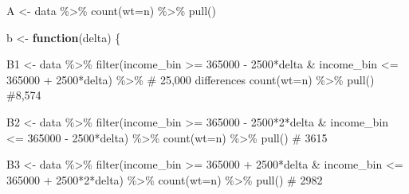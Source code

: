 \documentclass[
  letterpaper,
  DIV=11,
  numbers=noendperiod]{scrartcl}
\newenvironment{Shaded}{\begin{snugshade}}{\end{snugshade}}
\newcommand{\AttributeTok}[1]{\textcolor[rgb]{0.40,0.45,0.13}{#1}}
\newcommand{\CommentTok}[1]{\textcolor[rgb]{0.37,0.37,0.37}{#1}}
\newcommand{\ControlFlowTok}[1]{\textcolor[rgb]{0.00,0.23,0.31}{\textbf{#1}}}
\newcommand{\DecValTok}[1]{\textcolor[rgb]{0.68,0.00,0.00}{#1}}
\newcommand{\FunctionTok}[1]{\textcolor[rgb]{0.28,0.35,0.67}{#1}}
\newcommand{\NormalTok}[1]{\textcolor[rgb]{0.00,0.23,0.31}{#1}}
\newcommand{\OtherTok}[1]{\textcolor[rgb]{0.00,0.23,0.31}{#1}}
\newcommand{\SpecialCharTok}[1]{\textcolor[rgb]{0.37,0.37,0.37}{#1}}
\begin{document}
\begin{Shaded}
\begin{Highlighting}[]
\NormalTok{A }\OtherTok{\textless{}{-}}\NormalTok{ data }\SpecialCharTok{\%\textgreater{}\%} \FunctionTok{count}\NormalTok{(}\AttributeTok{wt=}\NormalTok{n) }\SpecialCharTok{\%\textgreater{}\%} \FunctionTok{pull}\NormalTok{()}

\NormalTok{b }\OtherTok{\textless{}{-}} \ControlFlowTok{function}\NormalTok{(delta) \{}

\NormalTok{B1  }\OtherTok{\textless{}{-}}\NormalTok{ data }\SpecialCharTok{\%\textgreater{}\%} 
  \FunctionTok{filter}\NormalTok{(income\_bin }\SpecialCharTok{\textgreater{}=} \DecValTok{365000} \SpecialCharTok{{-}} \DecValTok{2500}\SpecialCharTok{*}\NormalTok{delta }\SpecialCharTok{\&}\NormalTok{ income\_bin }\SpecialCharTok{\textless{}=} \DecValTok{365000} \SpecialCharTok{+} \DecValTok{2500}\SpecialCharTok{*}\NormalTok{delta) }\SpecialCharTok{\%\textgreater{}\%}  \CommentTok{\# 25,000 differences}
  \FunctionTok{count}\NormalTok{(}\AttributeTok{wt=}\NormalTok{n) }\SpecialCharTok{\%\textgreater{}\%} 
  \FunctionTok{pull}\NormalTok{() }\CommentTok{\#8,574}

\NormalTok{B2 }\OtherTok{\textless{}{-}}\NormalTok{ data }\SpecialCharTok{\%\textgreater{}\%} 
  \FunctionTok{filter}\NormalTok{(income\_bin }\SpecialCharTok{\textgreater{}=} \DecValTok{365000} \SpecialCharTok{{-}} \DecValTok{2500}\SpecialCharTok{*}\DecValTok{2}\SpecialCharTok{*}\NormalTok{delta }\SpecialCharTok{\&}\NormalTok{ income\_bin }\SpecialCharTok{\textless{}=} \DecValTok{365000} \SpecialCharTok{{-}} \DecValTok{2500}\SpecialCharTok{*}\NormalTok{delta) }\SpecialCharTok{\%\textgreater{}\%} 
  \FunctionTok{count}\NormalTok{(}\AttributeTok{wt=}\NormalTok{n) }\SpecialCharTok{\%\textgreater{}\%} 
  \FunctionTok{pull}\NormalTok{() }\CommentTok{\# 3615}

\NormalTok{B3 }\OtherTok{\textless{}{-}}\NormalTok{ data }\SpecialCharTok{\%\textgreater{}\%} 
  \FunctionTok{filter}\NormalTok{(income\_bin }\SpecialCharTok{\textgreater{}=} \DecValTok{365000} \SpecialCharTok{+} \DecValTok{2500}\SpecialCharTok{*}\NormalTok{delta }\SpecialCharTok{\&}\NormalTok{ income\_bin }\SpecialCharTok{\textless{}=} \DecValTok{365000} \SpecialCharTok{+} \DecValTok{2500}\SpecialCharTok{*}\DecValTok{2}\SpecialCharTok{*}\NormalTok{delta) }\SpecialCharTok{\%\textgreater{}\%} 
  \FunctionTok{count}\NormalTok{(}\AttributeTok{wt=}\NormalTok{n) }\SpecialCharTok{\%\textgreater{}\%} 
  \FunctionTok{pull}\NormalTok{() }\CommentTok{\# 2982}


\end{Highlighting}
\end{Shaded}
\end{document}
